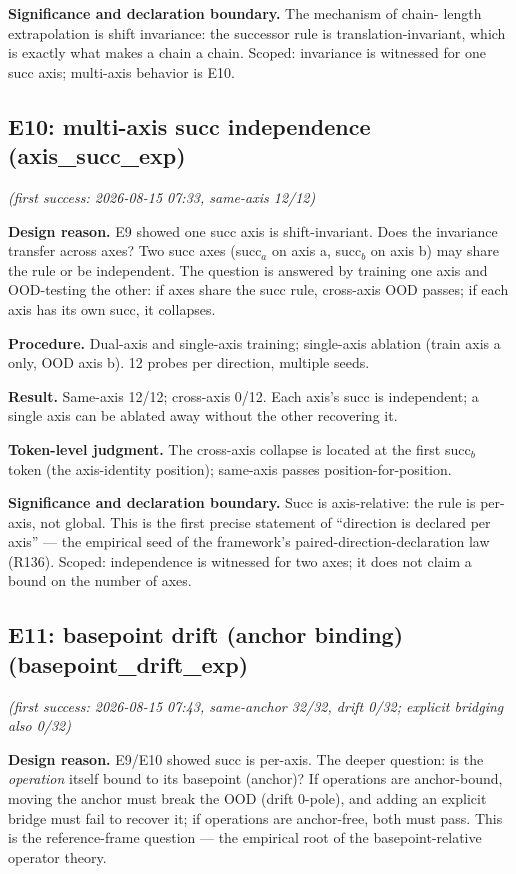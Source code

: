 \documentclass[sigplan,10pt,anonymous,review]{acmart}
\begin{document}
\textbf{Significance and declaration boundary.} The mechanism of chain-
length extrapolation is shift invariance: the successor rule is
translation-invariant, which is exactly what makes a chain a chain. Scoped:
invariance is witnessed for one succ axis; multi-axis behavior is E10.

\subsection{E10: multi-axis succ independence (axis\_succ\_exp)}\hfill\textit{(first success: 2026-08-15 07:33, same-axis 12/12)}

\textbf{Design reason.} E9 showed one succ axis is shift-invariant. Does
the invariance transfer across axes? Two succ axes (succ$_a$ on axis a,
succ$_b$ on axis b) may share the rule or be independent. The question is
answered by training one axis and OOD-testing the other: if axes share the
succ rule, cross-axis OOD passes; if each axis has its own succ, it
collapses.

\textbf{Procedure.} Dual-axis and single-axis training; single-axis
ablation (train axis a only, OOD axis b). 12 probes per direction,
multiple seeds.

\textbf{Result.} Same-axis 12/12; cross-axis 0/12. Each axis's succ is
independent; a single axis can be ablated away without the other
recovering it.

\textbf{Token-level judgment.} The cross-axis collapse is located at the
first succ$_b$ token (the axis-identity position); same-axis passes
position-for-position.

\textbf{Significance and declaration boundary.} Succ is axis-relative: the
rule is per-axis, not global. This is the first precise statement of
``direction is declared per axis'' --- the empirical seed of the framework's
paired-direction-declaration law (R136). Scoped: independence is witnessed
for two axes; it does not claim a bound on the number of axes.

\subsection{E11: basepoint drift (anchor binding) (basepoint\_drift\_exp)}\hfill\textit{(first success: 2026-08-15 07:43, same-anchor 32/32, drift 0/32; explicit bridging also 0/32)}

\textbf{Design reason.} E9/E10 showed succ is per-axis. The deeper question:
is the \emph{operation} itself bound to its basepoint (anchor)? If
operations are anchor-bound, moving the anchor must break the OOD (drift
0-pole), and adding an explicit bridge must fail to recover it; if
operations are anchor-free, both must pass. This is the reference-frame
question --- the empirical root of the basepoint-relative operator theory.
\end{document}
